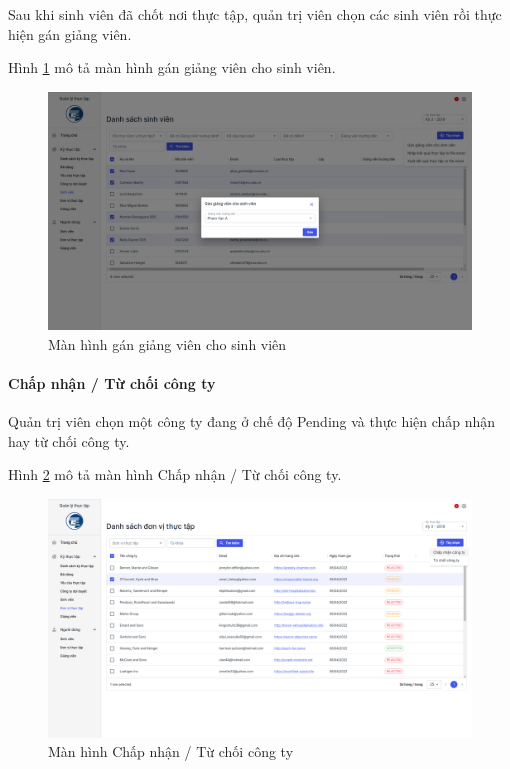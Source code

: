 \documentclass[./../main.tex]{subfiles}
\begin{document}
Sau khi sinh viên đã chốt nơi thực tập, quản trị viên chọn các sinh viên rồi thực hiện gán giảng viên.

Hình \ref{fig:assign_lecturer} mô tả màn hình gán giảng viên cho sinh viên.

\begin{figure}[]
	\includegraphics[width=\linewidth]{./images/image22.png}
	\caption{Màn hình gán giảng viên cho sinh viên}
	\label{fig:assign_lecturer}
\end{figure}

\paragraph*{Chấp nhận / Từ chối công ty}

Quản trị viên chọn một công ty đang ở chế độ Pending và thực hiện chấp nhận hay từ chối công ty.

Hình \ref{fig:reject_or_approve_company} mô tả màn hình Chấp nhận / Từ chối công ty.

\begin{figure}[]
	\includegraphics[width=\linewidth]{./images/image21.png}
	\caption{Màn hình Chấp nhận / Từ chối công ty}
	\label{fig:reject_or_approve_company}
\end{figure}
\end{document}

